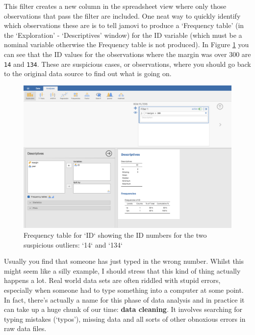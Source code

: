 \documentclass[
]{book}
\begin{document}
This filter creates a new column in the spreadsheet view where only those observations that pass the filter are included. One neat way to quickly identify which observations these are is to tell jamovi to produce a `Frequency table' (in the `Exploration' - `Descriptives' window) for the ID variable (which must be a nominal variable otherwise the Frequency table is not produced). In Figure \ref{fig:filter2} you can see that the ID values for the observations where the margin was over 300 are \texttt{14} and \texttt{134}. These are suspicious cases, or observations, where you should go back to the original data source to find out what is going on.

\begin{figure}

{\centering \includegraphics[width=1\linewidth]{img/graphics/filter2} 

}

\caption{Frequency table for `ID` showing the ID numbers for the two suspicious outliers: `14` and `134`}\label{fig:filter2}
\end{figure}

Usually you find that someone has just typed in the wrong number. Whilst this might seem like a silly example, I should stress that this kind of thing actually happens a lot. Real world data sets are often riddled with stupid errors, especially when someone had to type something into a computer at some point. In fact, there's actually a name for this phase of data analysis and in practice it can take up a huge chunk of our time: {\textbf{data cleaning}}. It involves searching for typing mistakes (`typos'), missing data and all sorts of other obnoxious errors in raw data files.
\end{document}
